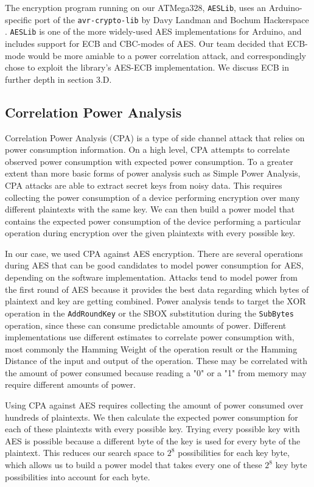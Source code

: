 \documentclass[journal]{ieee_style}
\begin{document}
The encryption program running on our ATMega328, \texttt{AESLib}, uses an Arduino-specific port of the \texttt{avr-crypto-lib} by Davy Landman and Bochum Hackerspace \cite{AESLib} \cite{daslabor}. \texttt{AESLib} is one of the more widely-used AES implementations for Arduino, and includes support for ECB and CBC-modes of AES. Our team decided that ECB-mode would be more amiable to a power correlation attack, and correspondingly chose to exploit the library's AES-ECB implementation. We discuss ECB in further depth in section 3.D.

\subsection{Correlation Power Analysis}
Correlation Power Analysis (CPA) is a type of side channel attack that relies on power consumption information. On a high level, CPA attempts to correlate observed power consumption with expected power consumption. To a greater extent than more basic forms of power analysis such as Simple Power Analysis, CPA attacks are able to extract secret keys from noisy data. This requires collecting the power consumption of a device performing encryption over many different plaintexts with the same key. We can then build a power model that contains the expected power consumption of the device performing a particular operation during encryption over the given plaintexts with every possible key. 

In our case, we used CPA against AES encryption. There are several operations during AES that can be good candidates to model power consumption for AES, depending on the software implementation. Attacks tend to model power from the first round of AES because it provides the best data regarding which bytes of plaintext and key are getting combined. Power analysis tends to target the XOR operation in the \texttt{AddRoundKey} or the SBOX substitution during the \texttt{SubBytes} operation, since these can consume predictable amounts of power. Different implementations use different estimates to correlate power consumption with, most commonly the Hamming Weight of the operation result or the Hamming Distance of the input and output of the operation. These may be correlated with the amount of power consumed because reading a "0" or a "1" from memory may require different amounts of power.
 
Using CPA against AES requires collecting the amount of power consumed over hundreds of plaintexts. We then calculate the expected power consumption for each of these plaintexts with every possible key. Trying every possible key with AES is possible because a different byte of the key is used for every byte of the plaintext. This reduces our search space to $2^8$ possibilities for each key byte, which allows us to build a power model that takes every one of these $2^8$ key byte possibilities into account for each byte. 
\end{document}

